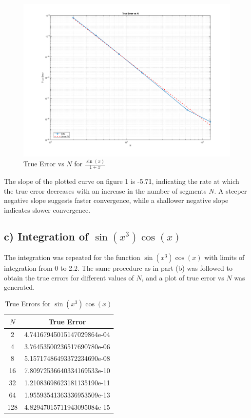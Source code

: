 \clearpage

\begin{figure}[h]
    \centering
    \includegraphics[width=1\textwidth]{Q2-plot1.png}
    \caption{True Error vs $N$ for $\frac{\sin(x)}{1+x}$}
    \label{fig:sinx1plusx}
\end{figure}

The slope of the plotted curve on figure 1 is -5.71, indicating the rate at which the true error decreases with an increase in the number of segments $N$. A steeper negative slope suggests faster convergence, while a shallower negative slope indicates slower convergence.

\subsection*{c) Integration of $\sin(x^3) \cos(x)$}

The integration was repeated for the function $\sin(x^3) \cos(x)$ with limits of integration from 0 to 2.2. The same procedure as in part (b) was followed to obtain the true errors for different values of $N$, and a plot of true error vs $N$ was generated.

\clearpage

\begin{table}[h]
    \centering
    \begin{tabular}{|c|c|}
    \hline
    $N$ & True Error \\
    \hline
    2 & 4.74167945015147029864e-04 \\
    4 & 3.76453500236517690780e-06 \\
    8 & 5.15717486493372234690e-08 \\
    16 & 7.80972536640334169533e-10 \\
    32 & 1.21083698623181135190e-11 \\
    64 & 1.95593541363336953509e-13 \\
    128 & 4.82947015711943095084e-15 \\
    \hline
    \end{tabular}
    \caption{True Errors for $\sin(x^3) \cos(x)$}
    \label{tab:sinx3cosx}
\end{table}



